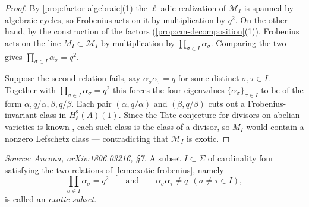 \begin{proof}
  By \cref{prop:factor-algebraic}(1) the \(\ell\)-adic realization of
  \(\mathcal{M}_I\) is spanned by algebraic cycles, so Frobenius acts on it by
  multiplication by \(q^2\). On the other hand, by the construction of the
  factors (\cref{prop:cm-decomposition}(1)), Frobenius acts on the line
  \(M_I \subset \mathcal{M}_I\) by multiplication by
  \(\prod_{\sigma \in I} \alpha_\sigma\). Comparing the two gives
  \(\prod_{\sigma \in I} \alpha_\sigma = q^2\).

  Suppose the second relation fails, say
  \(\alpha_\sigma \alpha_\tau = q\) for some distinct \(\sigma, \tau \in I\).
  Together with \(\prod_{\sigma \in I} \alpha_\sigma = q^2\) this forces the
  four eigenvalues \(\{\alpha_\sigma\}_{\sigma \in I}\) to be of the form
  \(\alpha, q/\alpha, \beta, q/\beta\). Each pair \((\alpha, q/\alpha)\) and
  \((\beta, q/\beta)\) cuts out a Frobenius-invariant class in
  \(H^2_\ell(A)(1)\). Since the Tate conjecture for divisors on abelian
  varieties is known \cite[Theorem 4]{Tate}, each such class is the class of a
  divisor, so \(M_I\) would contain a nonzero Lefschetz class — contradicting
  that \(\mathcal{M}_I\) is exotic.
\end{proof}

\begin{definition}
  \label{def:exotic-subset}
  \textit{Source: Ancona, arXiv:1806.03216, §7.}
  A subset \(I \subset \Sigma\) of cardinality four satisfying the two relations
  of \cref{lem:exotic-frobenius}, namely
  \[\prod_{\sigma \in I} \alpha_\sigma = q^2
    \qquad \text{and} \qquad
    \alpha_\sigma \alpha_\tau \neq q
    \ \ (\sigma \neq \tau \in I),\]
  is called an \emph{exotic subset}.
\end{definition}

